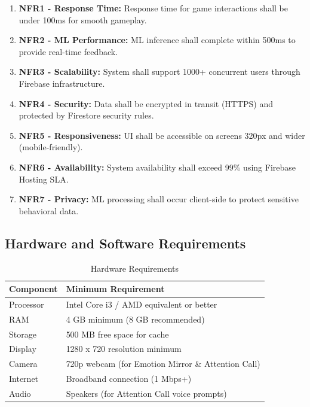 \documentclass[12pt,letterpaper]{article}
\begin{document}
\begin{enumerate}
    \item \textbf{NFR1 - Response Time:} Response time for game interactions shall be under 100ms for smooth gameplay.
    
    \item \textbf{NFR2 - ML Performance:} ML inference shall complete within 500ms to provide real-time feedback.
    
    \item \textbf{NFR3 - Scalability:} System shall support 1000+ concurrent users through Firebase infrastructure.
    
    \item \textbf{NFR4 - Security:} Data shall be encrypted in transit (HTTPS) and protected by Firestore security rules.
    
    \item \textbf{NFR5 - Responsiveness:} UI shall be accessible on screens 320px and wider (mobile-friendly).
    
    \item \textbf{NFR6 - Availability:} System availability shall exceed 99\% using Firebase Hosting SLA.
    
    \item \textbf{NFR7 - Privacy:} ML processing shall occur client-side to protect sensitive behavioral data.
\end{enumerate}

\subsection{Hardware and Software Requirements}

\begin{table}[H]
\centering
\begin{tabular}{|l|l|}
\hline
\textbf{Component} & \textbf{Minimum Requirement} \\
\hline
Processor & Intel Core i3 / AMD equivalent or better \\
\hline
RAM & 4 GB minimum (8 GB recommended) \\
\hline
Storage & 500 MB free space for cache \\
\hline
Display & 1280 x 720 resolution minimum \\
\hline
Camera & 720p webcam (for Emotion Mirror \& Attention Call) \\
\hline
Internet & Broadband connection (1 Mbps+) \\
\hline
Audio & Speakers (for Attention Call voice prompts) \\
\hline
\end{tabular}
\caption{Hardware Requirements}
\end{table}
\end{document}
